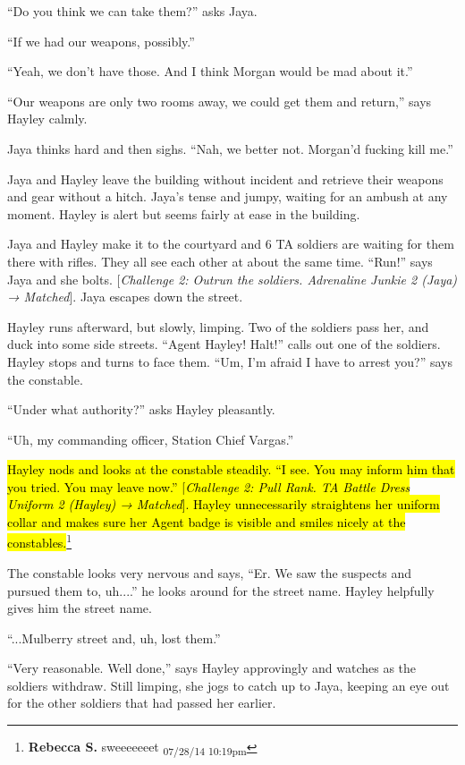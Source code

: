 ``Do you think we can take them?'' asks Jaya.

``If we had our weapons, possibly.''

``Yeah, we don't have those.  And I think Morgan would be mad about it.''

``Our weapons are only two rooms away, we could get them and return,'' says Hayley calmly.

Jaya thinks hard and then sighs.  ``Nah, we better not.  Morgan'd fucking kill me.''

Jaya and Hayley leave the building without incident and retrieve their weapons and gear without a hitch.  Jaya's tense and jumpy, waiting for an ambush at any moment.  Hayley is alert but seems fairly at ease in the building.



Jaya and Hayley make it to the courtyard and 6 TA soldiers are waiting for them there with rifles.  They all see each other at about the same time.  ``Run!'' says Jaya and she bolts.  {[}\textit{Challenge 2: Outrun the soldiers.  Adrenaline Junkie 2 (Jaya) → Matched}{]}.  Jaya escapes down the street.



Hayley runs afterward, but slowly, limping.  Two of the soldiers pass her, and duck into some side streets.  ``Agent Hayley!  Halt!'' calls out one of the soldiers.  Hayley stops and turns to face them. ``Um, I'm afraid I have to arrest you?'' says the constable.

``Under what authority?'' asks Hayley pleasantly.

``Uh, my commanding officer, Station Chief Vargas.''

\hl{Hayley nods and looks at the constable steadily.  ``I see.  You may inform him that you tried.  You may leave now.'' {[}\textit{Challenge 2: Pull Rank.   TA Battle Dress Uniform 2 (Hayley) → Matched}{]}.  Hayley unnecessarily straightens her uniform collar and makes sure her Agent badge is visible and smiles nicely at the constables.}\footnote{\textbf{Rebecca S. }sweeeeeeet \textsubscript{07/28/14 10:19pm}}

The constable looks very nervous and says, ``Er.  We saw the suspects and pursued them to, uh....'' he looks around for the street name.  Hayley helpfully gives him the street name.

``...Mulberry street and, uh, lost them.''

``Very reasonable.  Well done,'' says Hayley approvingly and watches as the soldiers withdraw.  Still limping, she jogs to catch up to Jaya, keeping an eye out for the other soldiers that had passed her earlier.

